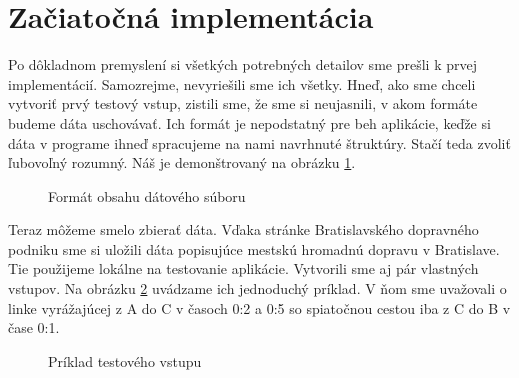 \section{Začiatočná implementácia}

Po dôkladnom premyslení si všetkých potrebných detailov sme prešli k prvej implementácií. Samozrejme, nevyriešili sme ich všetky. Hneď, ako sme chceli vytvoriť prvý testový vstup, zistili sme, že sme si neujasnili, v akom formáte budeme dáta uschovávať. Ich formát je nepodstatný pre beh aplikácie, keďže si dáta v programe ihneď spracujeme na nami navrhnuté štruktúry. Stačí teda zvoliť ľubovoľný rozumný. Náš je demonštrovaný na obrázku \ref{Format_datoveho_suboru}.\newline

\begin{figure}[H]
  \caption{Formát obsahu dátového súboru}
  \label{Format_datoveho_suboru}
\end{figure}

Teraz môžeme smelo zbierať dáta. Vďaka stránke Bratislavského dopravného podniku sme si uložili dáta popisujúce mestskú hromadnú dopravu v Bratislave. Tie použijeme lokálne na testovanie aplikácie. Vytvorili sme aj pár vlastných vstupov. Na obrázku \ref{priklad_vstupu_1} uvádzame ich jednoduchý príklad. V ňom sme uvažovali o linke vyrážajúcej z A do C v časoch 0:2 a 0:5 so spiatočnou cestou iba z C do B v čase 0:1.\newline

\begin{figure}[H]
  \caption{Príklad testového vstupu}
  \label{priklad_vstupu_1}
\end{figure}

